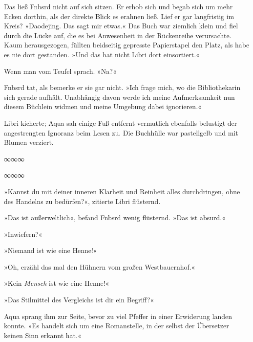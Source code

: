 Das ließ Fnbsrd nicht auf sich sitzen. Er erhob sich und begab sich um mehr Ecken dorthin, als der direkte Blick es erahnen ließ. Lief er gar langfristig im Kreis? »Daodejing. Das sagt mir etwas.« Das Buch war ziemlich klein und fiel durch die Lücke auf, die es bei Anwesenheit in der Rückenreihe verursachte. Kaum herausgezogen, füllten beidseitig gepresste Papierstapel den Platz, als habe es nie dort gestanden. »Und das hat nicht Libri dort einsortiert.«

Wenn man vom Teufel sprach. »Na?«

Fnbsrd tat, als bemerke er sie gar nicht. »Ich frage mich, wo die Bibliothekarin sich gerade aufhält. Unabhängig davon werde ich meine Aufmerksamkeit nun diesem Büchlein widmen und meine Umgebung dabei ignorieren.«

Libri kicherte; Aqua sah einige Fuß entfernt vermutlich ebenfalls belustigt der angestrengten Ignoranz beim Lesen zu. Die Buchhülle war pastellgelb und mit Blumen verziert.

\begin{center}
∞∞∞
\end{center}

\noindent {}

\begin{center}
∞∞∞
\end{center}

»Kannst du mit deiner inneren Klarheit und Reinheit alles durchdringen, ohne des Handelns zu bedürfen?«, zitierte Libri flüsternd.

»Das ist außerweltlich«, befand Fnbsrd wenig flüsternd. »Das ist absurd.«

»Inwiefern?«

»Niemand ist wie eine Henne!«

»Oh, erzähl das mal den Hühnern vom großen Westbauernhof.«

»Kein \emph{Mensch} ist wie eine Henne!«

»Das Stilmittel des Vergleichs ist dir ein Begriff?«

Aqua sprang ihm zur Seite, bevor zu viel Pfeffer in einer Erwiderung landen konnte. »Es handelt sich um eine Romanstelle, in der selbst der Übersetzer keinen Sinn erkannt hat.«

